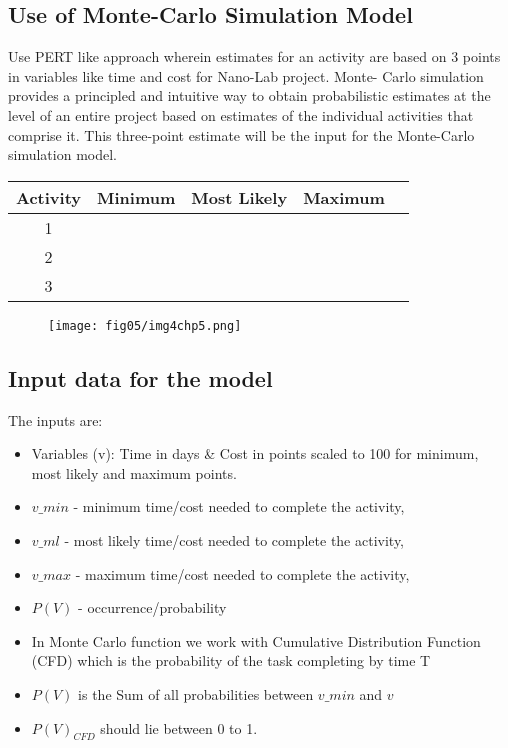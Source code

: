 \subsection{Use of Monte-Carlo Simulation Model}\label{section5.3.1}

Use PERT like approach wherein estimates for an activity are based on 3 points in variables like time and cost for Nano-Lab project. Monte- Carlo simulation provides a principled and intuitive way to obtain probabilistic estimates at the level of an entire project based on estimates of the individual activities that comprise it. This three-point estimate will be the input for the Monte-Carlo simulation model. 

\begin{center}
	\begin{tabular}{ |c|c|c|c| c|} 
		\hline
		Activity & Minimum & Most Likely & Maximum\\
		\hline
		1 & &  & \\ 
			\hline
		2 & & &\\ 
			\hline
		3& & &\\ 
		\hline
	\end{tabular}
\end{center}

\begin{figure}
	\centering
	\texttt{[image: fig05/img4chp5.png]}
\end{figure}

\subsection{Input data for the model} \label{5.3.2}
	
The inputs are:
\begin{itemize}
	\item Variables (v): Time in days \& Cost in points scaled to 100	 for minimum, most likely and maximum points.
	\item $v\_min$ - minimum time/cost needed to complete the activity,
	\item $v\_ml$ - most likely time/cost needed to complete the activity,
	\item $v\_max$ - maximum time/cost needed to complete the activity, 
	\item $P(V)$ - occurrence/probability
	\item In Monte Carlo function we work with Cumulative Distribution Function (CFD) which is the probability of the task completing by time T
	\item $P(V)$ is the Sum of all probabilities between $v\_min$ and $v$
	\item $P(V)_{CFD}$ should lie between 0 to 1.
\end{itemize}
     
